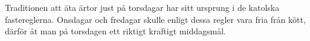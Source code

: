 \vspace{10pt}
Traditionen att äta ärtor just på torsdagar har sitt ursprung i de
katolska fastereglerna. Onsdagar och fredagar skulle enligt dessa
regler vara fria från kött, därför åt man på torsdagen ett riktigt
kraftigt middagsmål.
